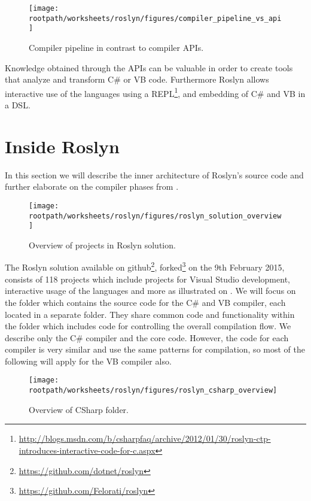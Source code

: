 \begin{figure}[htbp]
\centering
 \texttt{[image: \\rootpath/worksheets/roslyn/figures/compiler\_pipeline\_vs\_api]} 
 \caption{Compiler pipeline in contrast to compiler \acp{API}\cite[p. 4]{ng2012roslyn}.}
\label{fig:api_vs_compiler_pipeline}
\end{figure}

Knowledge obtained through the \acp{API} can be valuable in order to create tools that analyze and transform C\# or \ac{VB} code. Furthermore Roslyn allows interactive use of the languages using a \acs{REPL}\footnote{\url{http://blogs.msdn.com/b/csharpfaq/archive/2012/01/30/roslyn-ctp-introduces-interactive-code-for-c.aspx}}, and embedding of  C\# and \ac{VB} in a \ac{DSL}\cite[p. 3]{ng2012roslyn}.

\section{Inside Roslyn}\label{sec:inside_ros}
In this section we will describe the inner architecture of Roslyn's source code and further elaborate on the compiler phases from . 

\begin{figure}[htbp]
\centering
 \texttt{[image: \\rootpath/worksheets/roslyn/figures/roslyn\_solution\_overview]} 
 \caption{Overview of projects in Roslyn solution.}
\label{fig:roslyn_solution_overview}
\end{figure}

The Roslyn solution available on github\footnote{\url{https://github.com/dotnet/roslyn}}, forked\footnote{\url{https://github.com/Felorati/roslyn}} on the 9th February 2015, consists of 118 projects which include projects for Visual Studio development, interactive usage of the languages and more as illustrated on . We will focus on the  folder which contains the source code for the C\# and \ac{VB} compiler, each located in a separate folder. They share common code and functionality within the  folder which includes code for controlling the overall compilation flow. We describe only the C\# compiler and the core code. However, the code for each compiler is very similar and use the same patterns for compilation\cite[09:36-10:36]{campbellDeeperRos}, so most of the following will apply for the \ac{VB} compiler also.

\begin{figure}[htbp]
\centering
 \texttt{[image: \\rootpath/worksheets/roslyn/figures/roslyn\_csharp\_overview]} 
 \caption{Overview of CSharp folder.}
\label{fig:roslyn_csharp_overview}
\end{figure}

